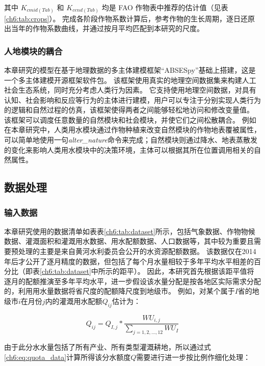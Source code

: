 其中 $K_{c mid(Tab)}$ 和 $K_{c end(Tab)}$ 均是 FAO 作物表中推荐的估计值（见表\ref{ch6:tab:crops}）。
完成各阶段作物系数计算后，参考作物的生长周期，逐日还原出当年的作物系数曲线，并通过按月平均匹配到本研究的尺度。

\subsubsection*{人地模块的耦合}

本章研究的模型在基于地理数据的多主体建模框架“ABSESpy”基础上搭建，这是一个多主体建模开源框架软件包。
该框架使用真实的地理空间数据集来构建人工社会生态系统，同时充分考虑人类行为因素。
它支持使用地理空间数据，对具有认知、社会影响和反应等行为的主体进行建模，用户可以专注于分别实现人类行为的逻辑和自然过程的仿真，该框架使得两者之间能够轻松地访问和修改变量值。
该框架可以调度任意数量的自然模块和社会模块，并使它们之间松散耦合。
例如在本章研究中，人类用水模块通过作物种植来改变自然模块的作物地表覆被属性，可以简单地使用一句\textit{alter\_nature}命令来完成；自然模块则通过降水、地表蒸散发的变化来影响人类用水模块中的决策环境，主体可以根据其所在位置调用相关的自然属性。

\subsection{数据处理}

\subsubsection*{输入数据}

本章研究使用的数据清单如表表\ref{ch6:tab:dataset}所示，包括气象数据、作物物候数据、灌溉面积和灌溉用水数据、用水配额数据、人口数据等，其中较为重要且需要预处理的主要是来自黄河水利委员会公开的水资源配额数据。
该数据仅在2014年后才公开了逐月精度的数据，但包括了每个月水量相较于多年平均水平相差的百分比（即表\ref{ch6:tab:dataset}中所示的距平）。
因此，本研究首先根据该距平值将逐月的配额推演至多年平均水平，进一步假设该水量分配是按各地区实际需求分配的，利用用水量数据将省尺度的配额降尺度到地级市。
例如，对某个属于$I$省的地级市$i$在月份$j$内的灌溉用水配额$Q_{ij}$估计为：

\begin{equation}
    \label{ch6:eq:quota_data}
    Q_{ij} = Q_{I, j} * \frac{WU_{i, j}}{\sum_{j = 1, 2, \dots, 12} WU_{I}}
\end{equation}

由于此分水水量包括了所有产业、所有类型灌溉耕地，所以通过式\ref{ch6:eq:quota_data}计算所得该分水额度$Q$需要进行进一步按比例作细化处理：

